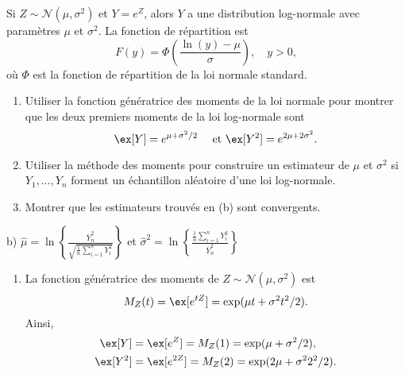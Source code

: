 \begin{exercice}
\label{ex:moment:distln}
Si $Z\sim \mathcal{N}(\mu,\sigma^2)$ et $Y=e^{Z}$, alors $Y$ a une distribution log-normale avec paramètres $\mu$ et $\sigma^2$. La fonction de répartition est
$$
F(y)=\Phi\left(\frac{\ln(y)-\mu}{\sigma}\right), \quad y>0,
$$
où $\Phi$ est la fonction de répartition de la loi normale standard. 
\begin{enumerate}
\item Utiliser la fonction génératrice des moments de la loi normale pour montrer que les deux premiers moments de la loi log-normale sont
$$
\ex[Y]=e^{\mu+\sigma^2/2}\quad \mbox{ et } \ex[Y^2]=e^{2\mu+2\sigma^2}.
$$
\item Utiliser la méthode des moments pour construire un estimateur de $\mu$ et $\sigma^2$ si $Y_1, \ldots, Y_n$ forment un échantillon aléatoire d'une loi log-normale.

\item Montrer que les estimateurs trouvés en (b) sont convergents.
\end{enumerate}
\begin{rep}
b) $\hat \mu = \ln\left\{\frac{\bar Y_n^2}{\sqrt{\frac{1}{n}\sum_{i=1}^n Y_i^2}} \right\}$ et $\hat\sigma^2 = \ln\left\{\frac{\frac{1}{n}\sum_{i=1}^n Y_i^2}{\bar Y_n^2} \right\}$
\end{rep}
\begin{sol}
\begin{enumerate}
\item La fonction génératrice des moments de $Z\sim\mathcal{N}(\mu,\sigma^2)$ est
$$
M_{Z}(t)=\ex[e^{tZ}]=\exp(\mu t +\sigma^2 t^2/2).
$$
Ainsi,
\begin{align*}
\ex[Y]&= \ex[e^{Z}]=M_Z(1)=\exp(\mu +\sigma^2/2),\\
\ex[Y^2]&= \ex[e^{2Z}]=M_Z(2)=\exp(2\mu +\sigma^2 2^2/2).
\end{align*}


\end{enumerate}
\end{sol}
\end{exercice}
